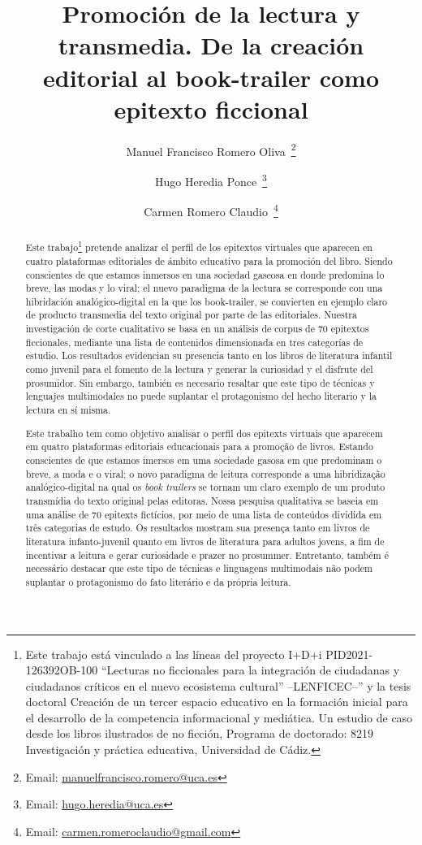 \documentclass[spanish]{textolivre}
\title{Promoción de la lectura y transmedia. De la creación editorial al book-trailer como epitexto ficcional}
\author[1]{Manuel Francisco Romero Oliva~\orcid{0000-0002-6854-0682}\thanks{Email: \href{mailto:manuelfrancisco.romero@uca.es}{manuelfrancisco.romero@uca.es}}}
\author[1]{Hugo Heredia Ponce~\orcid{0000-0003-3657-1369}\thanks{Email: \href{mailto:hugo.heredia@uca.es}{hugo.heredia@uca.es}}}
\author[1]{Carmen Romero Claudio~\orcid{0000-0002-2813-9579}\thanks{Email: \href{mailto:carmen.romeroclaudio@gmail.com}{carmen.romeroclaudio@gmail.com}}}
\affil[1]{Universidad de Cádiz, Facultad de Ciencias de la Educación, Departamento de Didáctica de la Lengua y la Literatura, Cádiz, España.}
\begin{document}
\maketitle

\begin{polyabstract}
\begin{abstract}
Este trabajo\footnote{Este trabajo está vinculado a las líneas del proyecto I+D+i PID2021-126392OB-100 “Lecturas no ficcionales para la integración de ciudadanas y ciudadanos críticos en el nuevo ecosistema cultural” –LENFICEC–” y la tesis doctoral Creación de un tercer espacio educativo en la formación inicial para el desarrollo de la competencia informacional y mediática. Un estudio de caso desde los libros ilustrados de no ficción, Programa de doctorado: 8219 Investigación y práctica educativa, Universidad de Cádiz.} pretende analizar el perfil de los epitextos virtuales que aparecen en cuatro plataformas editoriales de ámbito educativo para la promoción del libro. Siendo conscientes de que estamos inmersos en una sociedad gaseosa \cite{scolari2021}%
 en donde predomina lo breve, las modas y lo viral; el nuevo paradigma de la lectura se corresponde con una hibridación analógico-digital en la que los book-trailer, se convierten en ejemplo claro de producto transmedia del texto original por parte de las editoriales. Nuestra investigación de corte cualitativo se basa en un análisis de corpus de 70 epitextos ficcionales, mediante una lista de contenidos dimensionada en tres categorías de estudio. Los resultados evidencian su presencia tanto en los libros de literatura infantil como juvenil para el fomento de la lectura y generar la curiosidad y el disfrute del prosumidor. Sin embargo, también es necesario resaltar que este tipo de técnicas y lenguajes multimodales no puede suplantar el protagonismo del hecho literario y la lectura en sí misma.

\end{abstract}

\begin{portuguese}
\begin{abstract}
Este trabalho tem como objetivo analisar o perfil dos epitexts virtuais que aparecem em quatro plataformas editoriais educacionais para a promoção de livros. Estando conscientes de que estamos imersos em uma sociedade gasosa \cite{scolari2021}%
em que predominam o breve, a moda e o viral; o novo paradigma de leitura corresponde a uma hibridização analógico-digital na qual os \textit{book trailers} se tornam um claro exemplo de um produto transmídia do texto original pelas editoras. Nossa pesquisa qualitativa se baseia em uma análise de 70 epitexts fictícios, por meio de uma lista de conteúdos dividida em três categorias de estudo. Os resultados mostram sua presença tanto em livros de literatura infanto-juvenil quanto em livros de literatura para adultos jovens, a fim de incentivar a leitura e gerar curiosidade e prazer no prosummer. Entretanto, também é necessário destacar que este tipo de técnicas e linguagens multimodais não podem suplantar o protagonismo do fato literário e da própria leitura.


\end{abstract}
\end{portuguese}
\end{polyabstract}
\end{document}
